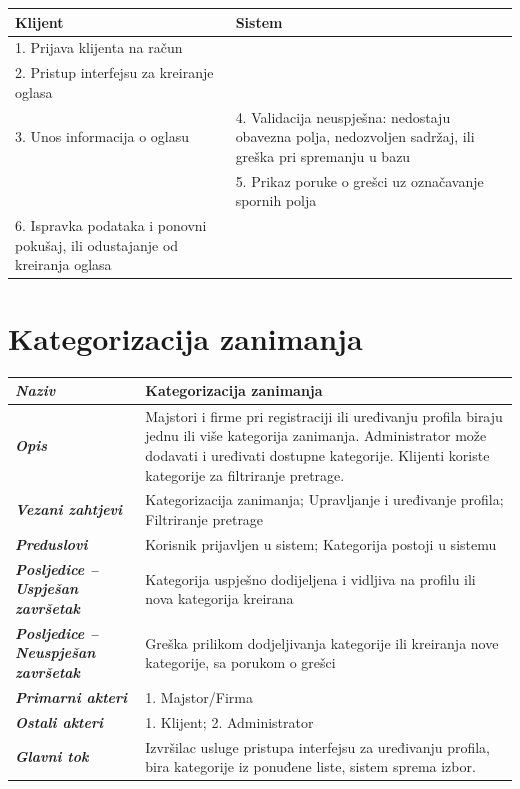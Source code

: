 \documentclass[12pt,a4paper]{article}
\newcommand{\usecase}[9]{%
\begin{longtable}{|L{4cm}|L{11cm}|}
\hline
\textbf{\textit{Naziv}} & \textbf{#1} \\
\hline
\textbf{\textit{Opis}} & #2 \\
\hline
\textbf{\textit{Vezani zahtjevi}} & #3 \\
\hline
\textbf{\textit{Preduslovi}} & #4 \\
\hline
\textbf{\textit{Posljedice -- Uspješan završetak}} & #5 \\
\hline
\textbf{\textit{Posljedice -- Neuspješan završetak}} & #6 \\
\hline
\textbf{\textit{Primarni akteri}} & #7 \\
\hline
\textbf{\textit{Ostali akteri}} & #8 \\
\hline
\textbf{\textit{Glavni tok}} & #9 \\
\hline
\end{longtable}%
}
\begin{document}
\begin{longtable}{|L{7.5cm}|L{7.5cm}|}
    \hline
    \textbf{Klijent}                                                            & \textbf{Sistem}                                                                                          \\
    . Prijava klijenta na račun                                                &                                                                                                          \\
    . Pristup interfejsu za kreiranje oglasa                                   &                                                                                                          \\
    . Unos informacija o oglasu                                                & 4. Validacija neuspješna: nedostaju obavezna polja, nedozvoljen sadržaj, ili greška pri spremanju u bazu \\
    \hline
                                                                                & 5. Prikaz poruke o grešci uz označavanje spornih polja                                                   \\
    . Ispravka podataka i ponovni pokušaj, ili odustajanje od kreiranja oglasa &                                                                                                          \\
    \hline
\end{longtable}

\section{Kategorizacija zanimanja}

\usecase
{Kategorizacija zanimanja}
{Majstori i firme pri registraciji ili uređivanju profila biraju jednu ili više kategorija zanimanja. Administrator može dodavati i uređivati dostupne kategorije. Klijenti koriste kategorije za filtriranje pretrage.}
{Kategorizacija zanimanja; Upravljanje i uređivanje profila; Filtriranje pretrage}
{Korisnik prijavljen u sistem; Kategorija postoji u sistemu}
{Kategorija uspješno dodijeljena i vidljiva na profilu ili nova kategorija kreirana}
{Greška prilikom dodjeljivanja kategorije ili kreiranja nove kategorije, sa porukom o grešci}
{1. Majstor/Firma}
{1. Klijent; 2. Administrator}
{Izvršilac usluge pristupa interfejsu za uređivanju profila, bira kategorije iz ponuđene liste, sistem sprema izbor.}
\end{document}
